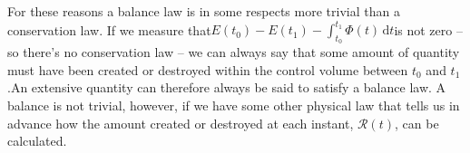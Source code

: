 \documentclass[a4paper,12pt,%
onecolumn,oneside,%
british%
]{memoir}
\newcommand*{\di}{\mathrm{d}}%
\renewcommand*{\|}[1][]{\nonscript\:#1\vert\nonscript\:\mathopen{}}
\newcommand*{\yti}{t_{0}}
\newcommand*{\ytf}{t_{1}}
\newcommand*{\dt}{\di t}
\newcommand*{\yE}{E}
\newcommand*{\yH}{\varPhi}%
\newcommand*{\yR}{\mathcal{R}}%
\begin{document}
%
%
For these reasons a balance law is in some respects more trivial than a conservation law. If we measure that\enskip$\yE(\yti) - \yE(\ytf) - \int_{\yti}^{\ytf}\!\yH(t)\, \dt$\enskip is not zero -- so there's no conservation law -- we can always say that some amount of quantity must have been created or destroyed within the control volume between $\yti$ and $\ytf$.\enskip An extensive quantity can therefore always be said to satisfy a balance law. A balance is not trivial, however, if we have some other physical law that tells us in advance how the amount created or destroyed at each instant, $\yR(t)$, can be calculated.
\end{document}
